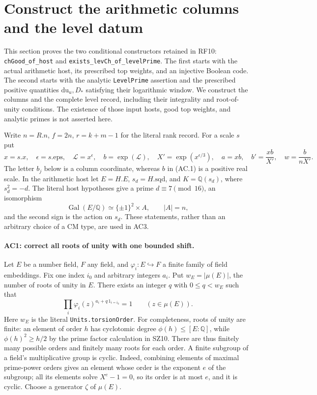 \section{Construct the arithmetic columns and the level datum}
\label{sec:arithmetic-constructors}

This section proves the two conditional constructors retained in RF10:
\texttt{chGood\_of\_host} and \texttt{exists\_levCh\_of\_levelPrime}.
The first starts with the actual arithmetic host, its prescribed top weights,
and an injective Boolean code. The second starts with the analytic
\texttt{LevelPrime} assertion and the prescribed positive quantities
$\mathrm{du}_u,D_*$ satisfying their logarithmic window. We construct the
columns and the complete level record, including their integrality and
root-of-unity conditions. The existence of those input hosts, good top
weights, and analytic primes is not asserted here.

Write $n=R.n$, $f=2n$, $r=k+m-1$ for the literal rank record. For a scale
$s$ put
\[
 x=s.x,\quad \epsilon=s.\mathrm{eps},\quad
 \mathcal L=x^\epsilon,\quad b=\exp(\mathcal L),\quad
 X'=\exp(x^{\epsilon/3}),\quad
 a=xb,\quad b'=\frac{xb}{X'},\quad w=\frac{b}{nX'}.
                                                               \tag{AC.1}
\]
The letter $b_j$ below is a column coordinate, whereas $b$ in (AC.1)
is a positive real scale. In the arithmetic host let
$E=H.E$, $s_d=H.\mathrm{sqd}$, and
$K=\mathbb Q(s_d)$, where $s_d^2=-d$.
The literal host hypotheses give a prime $d\equiv7\pmod {16}$,
an isomorphism
\[
 \operatorname{Gal}(E/\mathbb Q)
       \simeq\{\pm1\}^2\times A,
 \qquad |A|=n,
\]
and the second sign is the action on $s_d$.
These statements, rather than an arbitrary choice of a CM type, are
used in AC3.

\paragraph{AC1: correct all roots of unity with one bounded shift.}
Let $E$ be a number field, $F$ any field, and
$\varphi_i:E\hookrightarrow F$ a finite family of field embeddings.
Fix one index $i_0$ and arbitrary integers $a_i$. Put
$w_E=|\mu(E)|$, the number of roots of unity in $E$.
There exists an integer $q$ with $0\leq q<w_E$ such that
\[
       \prod_i\varphi_i(z)^{a_i+q\,1_{i=i_0}}=1
                  \qquad(z\in\mu(E)).                       \tag{AC.2}
\]
Here $w_E$ is the literal \texttt{Units.torsionOrder}.
For completeness, roots of unity are finite: an element of order $h$
has cyclotomic degree $\phi(h)\leq[E:\mathbb Q]$, while
$\phi(h)^2\geq h/2$ by the prime factor calculation in SZ10.
There are thus finitely many possible orders and finitely many roots
for each order. A finite subgroup of a field's multiplicative group is
cyclic. Indeed, combining elements of maximal prime-power orders gives
an element whose order is the exponent $e$ of the subgroup; all its
elements solve $X^e-1=0$, so its order is at most $e$, and it is cyclic.
Choose a generator $\zeta$ of $\mu(E)$.

